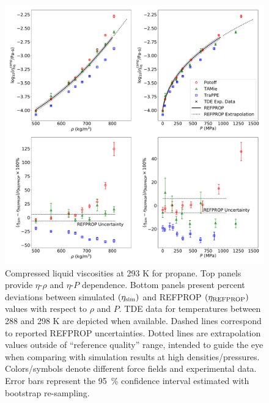 \documentclass[preprint,review,12pt]{elsarticle}
\begin{document}
	\begin{figure}[H]
		\centering
		\includegraphics[width=6.4in]{compare_REFPROP_T293highP_C3H8.pdf}
		\caption{Compressed liquid viscosities at 293 K for propane. Top panels provide $\eta$-$\rho$ and $\eta$-$P$ dependence. Bottom panels present percent deviations between simulated $(\eta_{\rm sim})$ and REFPROP $(\eta_{\rm REFPROP})$ values with respect to $\rho$ and $P$. TDE data for temperatures between 288 and 298 K are depicted when available. Dashed lines correspond to reported REFPROP uncertainties. Dotted lines are extrapolation values outside of ``reference quality'' range, intended to guide the eye when comparing with simulation results at high densities/pressures. Colors/symbols denote different force fields and experimental data. Error bars represent the 95~\% confidence interval estimated with bootstrap re-sampling.}
		\label{fig:T293highP_C3}
	\end{figure} 

	
\end{document}
